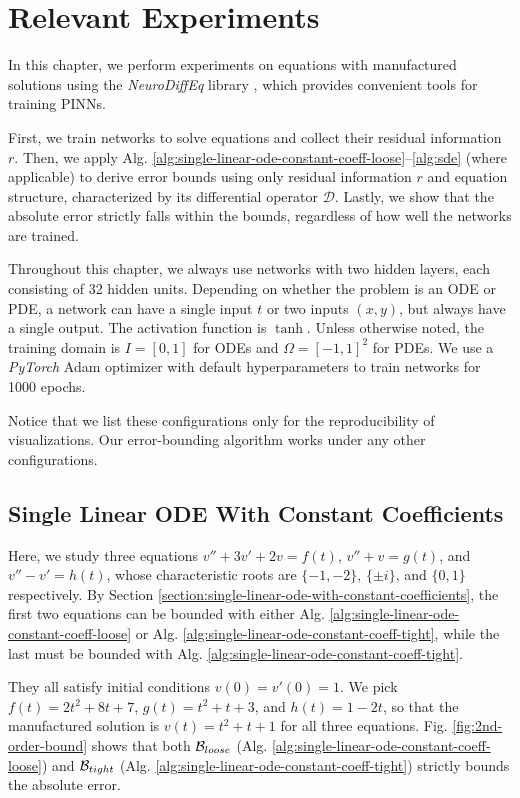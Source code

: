 \chapter{Relevant Experiments}\label{chapter:experiments}
    In this chapter, we perform experiments on equations with manufactured solutions using the \textit{NeuroDiffEq} library \citep{chen2020neurodiffeq}, which provides convenient tools for training PINNs. 

    First, we train networks to solve equations and collect their residual information $r$.
    Then, we apply Alg. \ref{alg:single-linear-ode-constant-coeff-loose}--\ref{alg:sde} (where applicable) to derive error bounds using only residual information $r$ and equation structure, characterized by its differential operator $\mathcal {D}$. 
    Lastly, we show that the absolute error strictly falls within the bounds, regardless of how well the networks are trained.

    Throughout this chapter, we always use networks with two hidden layers, each consisting of 32 hidden units.
    Depending on whether the problem is an ODE or PDE, a network can have a single input $t$ or two inputs $(x, y)$, but always have a single output.
    The activation function is $\tanh$. 
    Unless otherwise noted, the training domain is $I=[0, 1]$ for ODEs and $\Omega=[-1,1]^2$ for PDEs. 
    We use a \textit{PyTorch} Adam optimizer with default hyperparameters to train networks for 1000 epochs.

    Notice that we list these configurations only for the reproducibility of visualizations. 
    Our error-bounding algorithm works under any other configurations.

\section{Single Linear ODE With Constant Coefficients}
    Here, we study three equations $v'' + 3v' + 2v = f(t)$, $v'' + v = g(t)$, and $v'' - v' = h(t)$, whose characteristic roots are $\{-1, -2\}$, $\{\pm i\}$, and $\{0, 1\}$ respectively. 
    By Section \ref{section:single-linear-ode-with-constant-coefficients}, the first two equations can be bounded with either Alg. \ref{alg:single-linear-ode-constant-coeff-loose} or Alg. \ref{alg:single-linear-ode-constant-coeff-tight}, while the last must be bounded with Alg. \ref{alg:single-linear-ode-constant-coeff-tight}.

    They all satisfy initial conditions $v(0) = v'(0) = 1$. 
    We pick $f(t) =2t^2+8t+7$, $g(t) = t^2+t+3$, and $h(t)=1-2t$, so that the manufactured solution is $v(t) = t^2 + t + 1$ for all three equations.
    Fig. \ref{fig:2nd-order-bound} shows that both $\mathcal{B}_{loose}$ (Alg. \ref{alg:single-linear-ode-constant-coeff-loose}) and $\mathcal{B}_{tight}$ (Alg. \ref{alg:single-linear-ode-constant-coeff-tight}) strictly bounds the absolute error.
    
